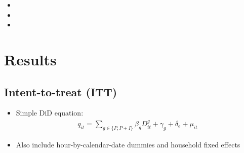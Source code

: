 \documentclass[12pt]{article}
\begin{document}
\begin{itemize}
    \item {}
    \item {}
    \item {}
\end{itemize}

\section{Results}
\subsection{Intent-to-treat (ITT)}
\begin{itemize}
    \item Simple DiD equation:
        \begin{align*}
            q _ { i t } = \sum _ { g \in \{ P , P + I \} } \beta _ { g } D _ { i t } ^ { g } + \gamma _ { g } + \delta _ { e } + \mu _ { i t }
        \end{align*}
    \item Also include hour-by-calendar-date dummies and household fixed effects
\end{itemize}
\end{document}
